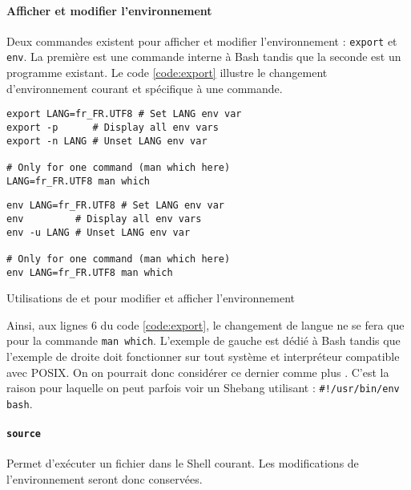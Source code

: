 \paragraph{Afficher et modifier l'environnement}
Deux commandes existent pour afficher et modifier l'environnement : \texttt{export} et \texttt{env}. La première est une commande interne à Bash tandis que la seconde est un programme existant. Le code \ref{code:export} illustre le changement d'environnement courant et spécifique à une commande.
\vspace{3mm}
\begin{code}
    \centering
    \noindent\begin{minipage}{.475\textwidth}
    \begin{verbatim}
export LANG=fr_FR.UTF8 # Set LANG env var
export -p      # Display all env vars
export -n LANG # Unset LANG env var

# Only for one command (man which here)
LANG=fr_FR.UTF8 man which
\end{verbatim}
\end{minipage}\hfill
\begin{minipage}{.475\textwidth}
\begin{verbatim}
env LANG=fr_FR.UTF8 # Set LANG env var
env         # Display all env vars
env -u LANG # Unset LANG env var

# Only for one command (man which here)
env LANG=fr_FR.UTF8 man which
\end{verbatim}
\end{minipage}\hfill
    \caption{Utilisations de  et  pour modifier et afficher l'environnement}
    \label{code:export}
\end{code}

Ainsi, aux lignes 6 du code \ref{code:export}, le changement de langue ne se fera que pour la commande \texttt{man which}. L'exemple de gauche est dédié à Bash tandis que l'exemple de droite doit fonctionner sur tout système et interpréteur compatible avec POSIX. On on pourrait donc considérer ce dernier comme plus . C'est la raison pour laquelle on peut parfois voir un Shebang utilisant  : \texttt{#!/usr/bin/env bash}.

\paragraph{\texttt{source}} 
Permet d'exécuter un fichier dans le Shell courant. Les modifications de l'environnement seront donc conservées. 

